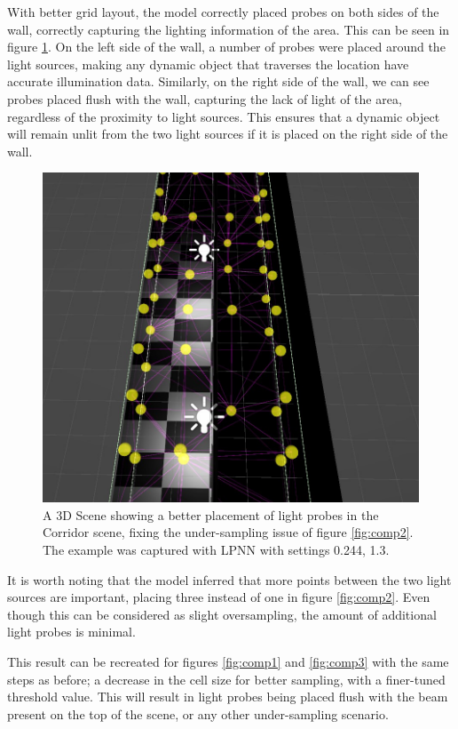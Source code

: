 With better grid layout, the model correctly placed probes on both sides of the wall, correctly capturing the lighting information of the area. This can be seen in figure \ref{fig:corr_1}. On the left side of the wall, a number of probes were placed around the light sources, making any dynamic object that traverses the location have accurate illumination data. Similarly, on the right side of the wall, we can see probes placed flush with the wall, capturing the lack of light of the area, regardless of the proximity to light sources. This ensures that a dynamic object will remain unlit from the two light sources if it is placed on the right side of the wall. 

\begin{figure}[h]
	\centering
	\includegraphics[scale=0.4]{Graphics/results/corridor_0.244_1.3.jpg}
	\caption{A 3D Scene showing a better placement of light probes in the Corridor scene, fixing the under-sampling issue of figure \ref{fig:comp2}. The example was captured with LPNN with settings 0.244, 1.3.}
	\label{fig:corr_1}
\end{figure}

It is worth noting that the model inferred that more points between the two light sources are important, placing three instead of one in figure \ref{fig:comp2}. Even though this can be considered as slight oversampling, the amount of additional light probes is minimal.

This result can be recreated for figures \ref{fig:comp1} and \ref{fig:comp3} with the same steps as before; a decrease in the cell size for better sampling, with a finer-tuned threshold value. This will result in light probes being placed flush with the beam present on the top of the scene, or any other under-sampling scenario.

